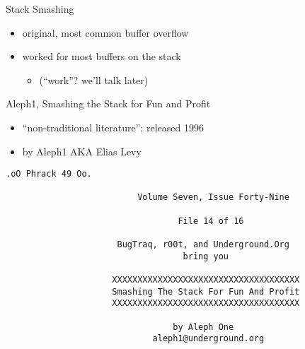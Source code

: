 
\begin{frame}{Stack Smashing}
    \begin{itemize}
    \item original, most common buffer overflow 
    \item worked for most buffers on the stack
        \begin{itemize}
        \item (``work''? we'll talk later)
        \end{itemize}
    \end{itemize}
\end{frame}

\begin{frame}[fragile,label=smashing]{Aleph1, Smashing the Stack for Fun and Profit}
    \begin{itemize}
    \item ``non-traditional literature''; released 1996
    \item by Aleph1 AKA Elias Levy
    \end{itemize}
\begin{Verbatim}[fontsize=\scriptsize]
                               .oO Phrack 49 Oo.

                          Volume Seven, Issue Forty-Nine
                                     
                                  File 14 of 16

                      BugTraq, r00t, and Underground.Org
                                   bring you

                     XXXXXXXXXXXXXXXXXXXXXXXXXXXXXXXXXXXXX
                     Smashing The Stack For Fun And Profit
                     XXXXXXXXXXXXXXXXXXXXXXXXXXXXXXXXXXXXX

                                 by Aleph One
                             aleph1@underground.org
\end{Verbatim}
\end{frame}

